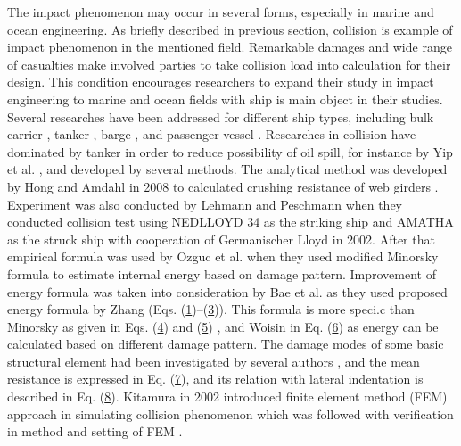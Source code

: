 \documentclass[../Final.tex]{subfiles}
\begin{document}
The impact phenomenon may occur in several forms, espe­cially in marine and ocean engineering. As briefly described in previous section, collision is example of impact phenomenon in the mentioned field. 
Remarkable damages and wide range of casualties make involved parties to take collision load into calculation for their design. 
This condition encourages researchers to expand their study in impact engineering to marine and ocean fields with ship is main object in their studies. 
Several researches have been addressed for different ship types, including bulk carrier \cite{ozguc2005comparative}, tanker \cite{haris2013analysis,bae2016numerical}, barge \cite{leheta2014finite}, and passenger vessel \cite{prabowo2016evaluating,prabowo2016energy,prabowo2017analysis,prabowo2017effects}. 
Researches in collision have dominated by tanker in order to reduce possibility of oil spill, for instance by Yip et al. \cite{yip2011effectiveness}, and developed by several methods. 
The analytical method was developed by Hong and Amdahl in 2008 to calcu­lated crushing resistance of web girders \cite{hong2008crushing}. Experiment was also conducted by Lehmann and Peschmann \cite{lehmann2002energy} 
when they conducted collision test using NEDLLOYD 34 as the striking ship and AMATHA as the struck ship with cooperation of Germanischer Lloyd in 2002. After that empirical formula was used by Ozguc et al. \cite{ozguc2005comparative} 
when they used modified Minorsky formula to estimate internal energy based on damage pattern. Improvement of energy formula was taken into consideration by Bae et al. \cite{bae2016study}
as they used proposed energy formula by Zhang (Eqs. (\hyperref[eq1]{1})–(\hyperref[eq3]{3})). This formula is more speci.c than Minorsky as given in Eqs. (\hyperref[eq4]{4}) and (\hyperref[eq5]{5}) \cite{minorsky1958analysis}, and Woisin in Eq. (\hyperref[eq6]{6}) \cite{woisin1979design} as energy can be calculated based on different damage pattern. 
The damage modes of some basic structural element had been investigated by several authors \cite{paik1995ultimate,lu1990cutting,wierzbicki1993closed,simonsen1997ship,prabowo2017structural}, and the mean resistance is expressed in Eq. (\hyperref[eq7]{7}), and its relation with lateral indentation is described in Eq. (\hyperref[eq8]{8}). Kitamura 
in 2002 introduced finite element method (FEM) approach in simulating collision phenomenon \cite{kitamura2002fem} which was followed with verification in method and setting of FEM \cite{wisniewski2003effect}. 
\end{document}
